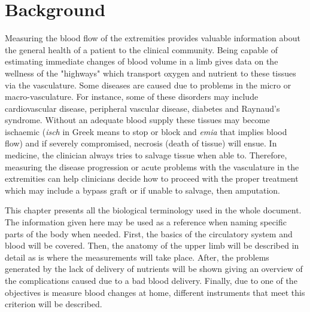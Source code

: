 
\chapter{Background}
\label{chapter background}

\ifpdf
    \graphicspath{{Chapter2/Figs/Raster/}{Chapter2/Figs/PDF/}{Chapter2/Figs/}}
\else
    \graphicspath{{Chapter2/Figs/Vector/}{Chapter2/Figs/}}
\fi

Measuring the blood flow of the extremities provides valuable information about the general health of a patient to the clinical community. Being capable of estimating immediate changes of blood volume in a limb gives data on the wellness of the "highways" which transport oxygen and nutrient to these tissues via the vasculature. Some diseases are caused due to problems in the micro or macro-vasculature. For instance, some of these disorders may include cardiovascular disease, peripheral vascular disease, diabetes and Raynaud's syndrome. Without an adequate blood supply these tissues may become ischaemic (\textit{isch} in Greek means to stop or block and \textit{emia} that implies blood flow) and if severely compromised, necrosis (death of tissue) will ensue. In medicine, the clinician always tries to salvage tissue when able to. Therefore, measuring the disease progression or acute problems with the vasculature in the extremities can help clinicians decide how to proceed with the proper treatment which may include a bypass graft or if unable to salvage, then amputation.

This chapter presents all the biological terminology used in the whole document. The information given here may be used as a reference when naming specific parts of the body when needed. First, the basics of the circulatory system and blood will be covered. Then, the anatomy of the upper limb will be described in detail as is where the measurements will take place. After, the problems generated by the lack of delivery of nutrients will be shown giving an overview of the complications caused due to a bad blood delivery. Finally, due to one of the objectives is measure blood changes at home, different instruments that meet this criterion will be described.   

